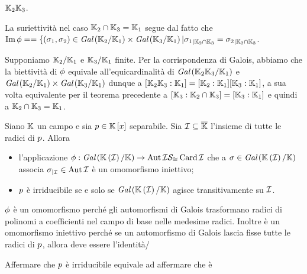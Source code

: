 $\mathbb{K}_2\mathbb{K}_3$.
\par
La suriettivit\`a nel caso $\mathbb{K}_2 \cap \mathbb{K}_3 = \mathbb{K}_1$
segue dal fatto che
$\operatorname{Im}{\phi} =
= \lbrace (\sigma_1, \sigma_2) \in
\textit{Gal} \left ( \mathbb{K}_2/\mathbb{K}_1 \right ) \times \textit{Gal} \left ( \mathbb{K}_3/\mathbb{K}_1 \right ) |
{\sigma_1}_{|\mathbb{K}_2 \cap \mathbb{K}_3} =
{\sigma_2}_{|\mathbb{K}_2 \cap \mathbb{K}_3}$.
\par
Supponiamo $\mathbb{K}_2/\mathbb{K}_1$ e
$\mathbb{K}_3/\mathbb{K}_1$ finite.
Per la corrispondenza di Galois, abbiamo che la biettivit\`a di
$\phi$ equivale all'equicardinalit\`a di
$\textit{Gal} \left ( \mathbb{K}_2\mathbb{K}_3/\mathbb{K}_1 \right )$
e
$\textit{Gal} \left ( \mathbb{K}_2/\mathbb{K}_1 \right ) \times \textit{Gal} \left ( \mathbb{K}_3/\mathbb{K}_1 \right )$
dunque a
$[\mathbb{K}_2\mathbb{K}_3:\mathbb{K}_1] =
[\mathbb{K}_2:\mathbb{K}_1]
[\mathbb{K}_3:\mathbb{K}_1]$,
a sua volta equivalente per il teorema precedente a
$[\mathbb{K}_3:\mathbb{K}_2 \cap \mathbb{K}_3] =
[\mathbb{K}_3:\mathbb{K}_1]$ e quindi a
$\mathbb{K}_2 \cap \mathbb{K}_3 = \mathbb{K}_1$.
\EndProof
\begin{Theorem}
	Siano $\mathbb{K}$ un campo e sia
	$p \in \mathbb{K} \left [ x \right ]$ separabile.
	Sia $\mathcal{I} \subseteq \overline{\mathbb{K}}$ l'insieme di tutte
	le radici di $p$.
	Allora
	\begin{itemize}
		\item l'applicazione
		$\phi:
		\textit{Gal} \left ( \mathbb{K} \left ( \mathcal{I} \right )/\mathbb{K} \right )
		\rightarrow
		\operatorname{Aut}{\mathcal{I}} \mathcal{S}_{\cong} \operatorname{Card}{\mathcal{I}}$
		 che a $\sigma \in
		\textit{Gal} \left ( \mathbb{K} \left ( \mathcal{I} \right )/\mathbb{K} \right )$
		 associa
		${\sigma}_{|\mathcal{I}} \in
		\operatorname{Aut}{\mathcal{I}}$
		\`e un omomorfismo iniettivo;
		\item $p$ \`e irriducibile se e solo se
		$\textit{Gal} \left ( \mathbb{K} \left ( \mathcal{I} \right )/\mathbb{K} \right )$
		agisce transitivamente su $\mathcal{I}$.
	\end{itemize}
\end{Theorem}
\Proof
$\phi$ \`e un omomorfismo perch\'e gli automorfismi di Galois
trasformano radici di polinomi a coefficienti nel campo di base nelle
medesime radici. Inoltre \`e un omomorfismo iniettivo perch\'e se un
automorfismo di Galois lascia fisse tutte le radici di $p$,
allora deve essere l'identit\`a/
\par
Affermare che $p$ \`e irriducibile equivale ad affermare che \`e
